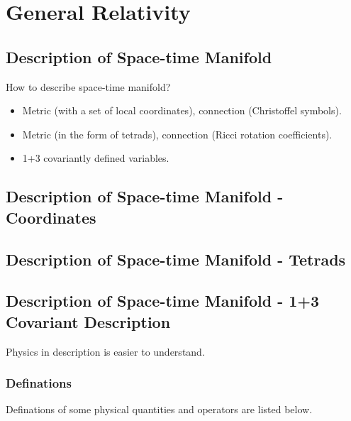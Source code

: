 \documentclass[letterpaper,10pt,english]{sphinxmanual}
\begin{document}
{\section{General Relativity}
\label{GeneralRelativity::doc}\label{GeneralRelativity:general-relativity}

\subsection{Description of Space-time Manifold}
\label{GeneralRelativity:description-of-space-time-manifold}
How to describe space-time manifold?
\begin{itemize}
\item {} 
Metric (with a set of local coordinates), connection (Christoffel symbols).

\item {} 
Metric (in the form of tetrads), connection (Ricci rotation coefficients).

\item {} 
1+3 covariantly defined variables.

\end{itemize}


\subsection{Description of Space-time Manifold - Coordinates}
\label{GeneralRelativity:description-of-space-time-manifold-coordinates}

\subsection{Description of Space-time Manifold - Tetrads}
\label{GeneralRelativity:description-of-space-time-manifold-tetrads}

\subsection{Description of Space-time Manifold - 1+3 Covariant Description}
\label{GeneralRelativity:description-of-space-time-manifold-1-3-covariant-description}
Physics in description is easier to understand.


\subsubsection{Definations}
\label{GeneralRelativity:definations}
Definations of some physical quantities and operators are listed below.

}
\end{document}
